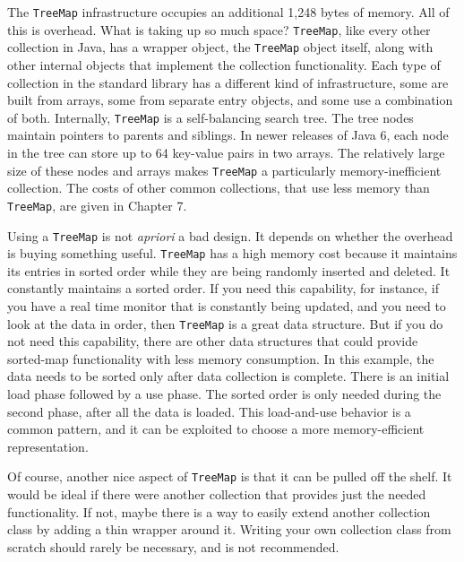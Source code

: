 \documentclass{book}
\theoremstyle{definition}
\begin{document}
The \texttt{TreeMap} infrastructure occupies an additional 1,248 bytes of memory. All of this is overhead. What is taking up so much space?  \texttt{TreeMap}, like every other collection in Java, has a wrapper object, the \texttt{TreeMap} object itself, along with other internal objects that implement the collection functionality. Each type of collection in the standard library has a different kind of infrastructure, some are built from arrays, some from separate entry objects, and some use a combination of both. Internally, \texttt{TreeMap} is a self-balancing search tree. The tree nodes maintain pointers to parents and siblings.  In newer releases of Java 6, each node in the tree can store up to 64 key-value pairs in two arrays.  The relatively large size of these nodes and arrays makes \texttt{TreeMap} a particularly memory-inefficient collection. The costs of other common collections, that use less memory than \texttt{TreeMap}, are given in Chapter 7.

Using a \texttt{TreeMap} is not \textit{apriori} a bad design. It depends on whether the overhead is buying something useful. \texttt{TreeMap} has a high memory cost because it maintains its entries in sorted order while they are being randomly inserted and deleted. It constantly maintains a sorted order. If you need this capability, for instance, if you have a real time monitor that is constantly being updated, and you need to look at the data in order, then \texttt{TreeMap} is a great data structure.  But if you do not need this capability, there are other data structures that could provide sorted-map functionality with less memory consumption. In this example, the data needs to be sorted only after data collection is complete. There is an initial load phase followed by a use phase. The sorted order is only needed during the second phase, after all the data is loaded. This load-and-use behavior is a common pattern, and it can be exploited to choose a more memory-efficient representation.

Of course, another nice aspect of \texttt{TreeMap} is that it can be pulled off the shelf. It would be ideal if there were another collection that provides just the needed functionality. If not, maybe there is a way to easily extend another collection class by adding a thin wrapper around it. Writing your own collection class from scratch should rarely be necessary, and is not recommended.
\end{document}
